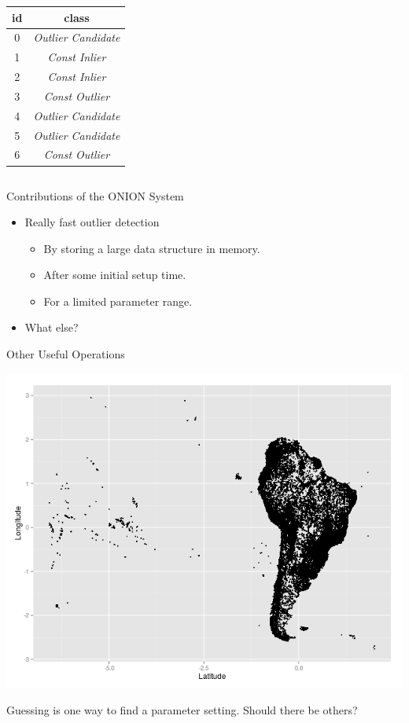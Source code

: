 \documentclass{beamer}
\begin{document}
\begin{frame}
{\begin{columns}
\begin{column}{.5\textwidth}
\begin{tabular}{|c|c|}
                    id & class \\
                    \hline
                    0 & \textit{Outlier Candidate} \\
                    1 & \textit{Const Inlier} \\
                    2 & \textit{Const Inlier} \\
                    3 & \textit{Const Outlier} \\
                    4 & \textit{Outlier Candidate} \\
                    5 & \textit{Outlier Candidate} \\
                    6 & \textit{Const Outlier} \\
                    \hline
                \end{tabular}
            \end{column}
        \end{columns}
    }
    \end{frame}
    \begin{frame}{Contributions of the ONION System}
        \begin{itemize}
            \item Really fast outlier detection 
                \begin{itemize}
                    \item By storing a large data structure in memory.
                    \item After some initial setup time.
                    \item For a limited parameter range.
                \end{itemize}
            \item What else?
        \end{itemize}
    \end{frame}
    \begin{frame}{Other Useful Operations}
    \begin{center}
        \includegraphics[width=\textwidth]{images/south_america.png}
    \end{center}
    Guessing is one way to find a parameter setting. Should there be others?
    \end{frame}
                        
\end{document}

